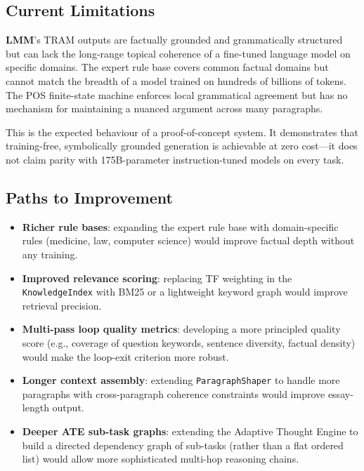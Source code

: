 \documentclass[11pt,a4paper]{article}
\newcommand{\lmm}{\texorpdfstring{%
  \textbf{\color{lmmAccent}LMM}}{LMM}}
\begin{document}
\subsection{Current Limitations}

\lmm{}'s TRAM outputs are factually grounded and grammatically structured but can lack the
long-range topical coherence of a fine-tuned language model on specific domains. The expert
rule base covers common factual domains but cannot match the breadth of a model trained on
hundreds of billions of tokens. The POS finite-state machine enforces local grammatical
agreement but has no mechanism for maintaining a nuanced argument across many paragraphs.

This is the expected behaviour of a proof-of-concept system. It demonstrates that
training-free, symbolically grounded generation is achievable at zero cost---it does not claim
parity with 175B-parameter instruction-tuned models on every task.

\subsection{Paths to Improvement}

\begin{itemize}[noitemsep,topsep=4pt]
  \item \textbf{Richer rule bases}: expanding the expert rule base with domain-specific rules
        (medicine, law, computer science) would improve factual depth without any training.
  \item \textbf{Improved relevance scoring}: replacing TF weighting in the
        \texttt{KnowledgeIndex} with BM25 or a lightweight keyword graph would improve
        retrieval precision.
  \item \textbf{Multi-pass loop quality metrics}: developing a more principled quality score
        (e.g., coverage of question keywords, sentence diversity, factual density) would
        make the loop-exit criterion more robust.
  \item \textbf{Longer context assembly}: extending \texttt{ParagraphShaper} to handle more
        paragraphs with cross-paragraph coherence constraints would improve essay-length output.
  \item \textbf{Deeper ATE sub-task graphs}: extending the Adaptive Thought Engine to build
        a directed dependency graph of sub-tasks (rather than a flat ordered list) would allow
        more sophisticated multi-hop reasoning chains.
\end{itemize}
\end{document}
